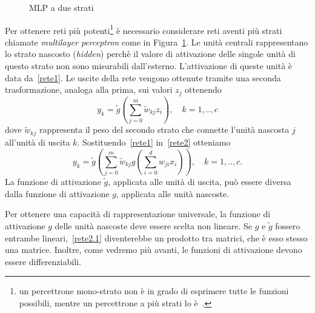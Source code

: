 \documentclass[11pt,a4paper,twoside,
openright]{book}
\begin{document}
\begin{figure}[ht!]
\begin{center}
\caption{MLP a due strati}
\label{fig:MLP2}
\end{center}
\end{figure}
Per ottenere reti più potenti\footnote{un percettrone mono-strato non è in grado di esprimere tutte le funzioni possibili, mentre un percettrone a più strati lo è~\cite{cybenko}.} è necessario considerare reti aventi più strati chiamate \textit{multilayer perceptron} come in Figura~\ref{fig:MLP2}. Le unità centrali rappresentano lo strato nascosto (\textit{hidden}) perchè il valore di attivazione delle singole unità di questo strato non sono misurabili dall'esterno. L'attivazione di queste unità è data da~\eqref{rete1}. Le uscite della rete vengono ottenute tramite una seconda trasformazione, analoga alla prima, sui valori $z_j$ ottenendo
\begin{equation}
y_k = \tilde{g}\left(\sum\limits_{j=0}^m \tilde{w}_{kj}z_i\right), \quad
k=1,..,c
\label{rete2}
\end{equation}
dove $\tilde{w}_{kj}$ rappresenta il peso del secondo strato che connette l'unità nascosta $j$ all'unità di uscita $k$. Sostituendo~\eqref{rete1} in~\eqref{rete2} otteniamo
\begin{equation}
y_k = \tilde{g}\left( \sum\limits_{j=0}^m \tilde{w}_{kj}g\left(\sum\limits_{i=0}^d w_{ji}x_i\right) \right), \quad
k=1,..,c.
\label{rete2.1}
\end{equation}
La funzione di attivazione $\tilde{g}$, applicata alle unità di uscita, può essere diversa dalla funzione di attivazione $g$, applicata alle unità nascoste.

Per ottenere una capacità di rappresentazione universale, la funzione di attivazione $g$ delle unità nascoste deve essere scelta non lineare. Se $g$ e $\tilde{g}$ fossero entrambe lineari,~\eqref{rete2.1} diventerebbe un prodotto tra matrici, che è esso stesso una matrice. Inoltre, come vedremo più avanti, le funzioni di attivazione devono essere differenziabili.
\end{document}
